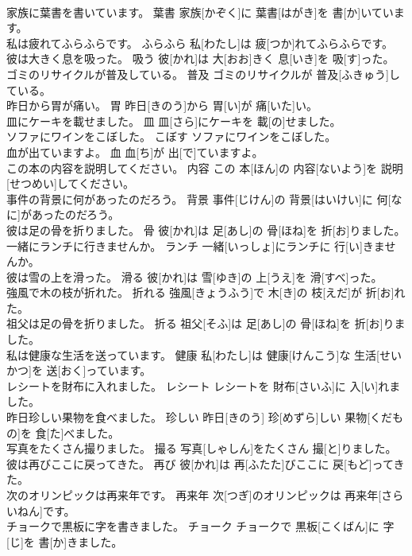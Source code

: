 \documentclass[8pt]{extreport}
\begin{document}
\begin{CJK}{UTF8}{min}
\\	家族に葉書を書いています。	葉書	家族[かぞく]に 葉書[はがき]を 書[か]いています。	
\\	私は疲れてふらふらです。	ふらふら	私[わたし]は 疲[つか]れてふらふらです。	
\\	彼は大きく息を吸った。	吸う	彼[かれ]は 大[おお]きく 息[いき]を 吸[す]った。	
\\	ゴミのリサイクルが普及している。	普及	ゴミのリサイクルが 普及[ふきゅう]している。	
\\	昨日から胃が痛い。	胃	昨日[きのう]から 胃[い]が 痛[いた]い。	
\\	皿にケーキを載せました。	皿	皿[さら]にケーキを 載[の]せました。	
\\	ソファにワインをこぼした。	こぼす	ソファにワインをこぼした。	
\\	血が出ていますよ。	血	血[ち]が 出[で]ていますよ。	
\\	この本の内容を説明してください。	内容	この 本[ほん]の 内容[ないよう]を 説明[せつめい]してください。	
\\	事件の背景に何があったのだろう。	背景	事件[じけん]の 背景[はいけい]に 何[なに]があったのだろう。	
\\	彼は足の骨を折りました。	骨	彼[かれ]は 足[あし]の 骨[ほね]を 折[お]りました。	
\\	一緒にランチに行きませんか。	ランチ	一緒[いっしょ]にランチに 行[い]きませんか。	
\\	彼は雪の上を滑った。	滑る	彼[かれ]は 雪[ゆき]の 上[うえ]を 滑[すべ]った。	
\\	強風で木の枝が折れた。	折れる	強風[きょうふう]で 木[き]の 枝[えだ]が 折[お]れた。	
\\	祖父は足の骨を折りました。	折る	祖父[そふ]は 足[あし]の 骨[ほね]を 折[お]りました。	
\\	私は健康な生活を送っています。	健康	私[わたし]は 健康[けんこう]な 生活[せいかつ]を 送[おく]っています。	
\\	レシートを財布に入れました。	レシート	レシートを 財布[さいふ]に 入[い]れました。	
\\	昨日珍しい果物を食べました。	珍しい	昨日[きのう] 珍[めずら]しい 果物[くだもの]を 食[た]べました。	
\\	写真をたくさん撮りました。	撮る	写真[しゃしん]をたくさん 撮[と]りました。	
\\	彼は再びここに戻ってきた。	再び	彼[かれ]は 再[ふたた]びここに 戻[もど]ってきた。	
\\	次のオリンピックは再来年です。	再来年	次[つぎ]のオリンピックは 再来年[さらいねん]です。	
\\	チョークで黒板に字を書きました。	チョーク	チョークで 黒板[こくばん]に 字[じ]を 書[か]きました。	

\end{CJK}
\end{document}

